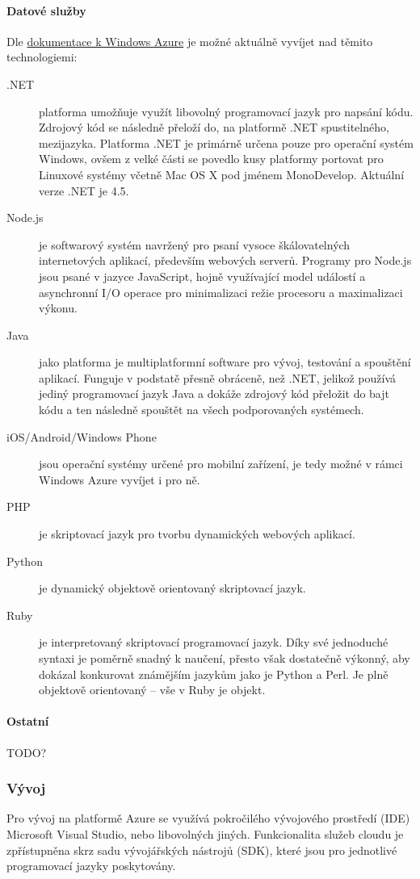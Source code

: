 \paragraph{Datové služby}
Dle \href{http://www.windowsazure.com/en-us/documentation/}{dokumentace k Windows Azure}\cite{azure:dokumentace} je možné aktuálně vyvíjet nad těmito technologiemi:
\begin{description}
	\item [.NET] platforma umožňuje využít libovolný programovací jazyk pro napsání kódu. Zdrojový kód se následně přeloží do, na platformě .NET spustitelného, mezijazyka. Platforma .NET je primárně určena pouze pro operační systém Windows, ovšem z velké části se povedlo kusy platformy portovat pro Linuxové systémy včetně Mac OS X pod jménem MonoDevelop. Aktuální verze .NET je 4.5.
	\item [Node.js] je softwarový systém navržený pro psaní vysoce škálovatelných internetových aplikací, především webových serverů. Programy pro Node.js jsou psané v jazyce JavaScript, hojně využívající model událostí a asynchronní I/O operace pro minimalizaci režie procesoru a maximalizaci výkonu.\cite{wiki:node.js}
	\item [Java] jako platforma je multiplatformní software pro vývoj, testování a spouštění aplikací. Funguje v podstatě přesně obráceně, než .NET, jelikož používá jediný programovací jazyk Java a dokáže zdrojový kód přeložit do bajt kódu a ten následně spouštět na všech podporovaných systémech.
	\item [iOS/Android/Windows Phone] jsou operační systémy určené pro mobilní zařízení, je tedy možné v rámci Windows Azure vyvíjet i pro ně.
	\item [PHP] je skriptovací jazyk pro tvorbu dynamických webových aplikací.
	\item [Python] je dynamický objektově orientovaný skriptovací jazyk.
	\item [Ruby] je interpretovaný skriptovací programovací jazyk. Díky své jednoduché syntaxi je poměrně snadný k naučení, přesto však dostatečně výkonný, aby dokázal konkurovat známějším jazykům jako je Python a Perl. Je plně objektově orientovaný – vše v Ruby je objekt.\cite{wiki:ruby}
\end{description}

\paragraph{Ostatní}
TODO?

\subsubsection{Vývoj}
Pro vývoj na platformě Azure se využívá pokročilého vývojového prostředí (IDE) Microsoft Visual Studio, nebo libovolných jiných. Funkcionalita služeb cloudu je zpřístupněna skrz sadu vývojářských nástrojů (SDK), které jsou pro jednotlivé programovací jazyky poskytovány. 

